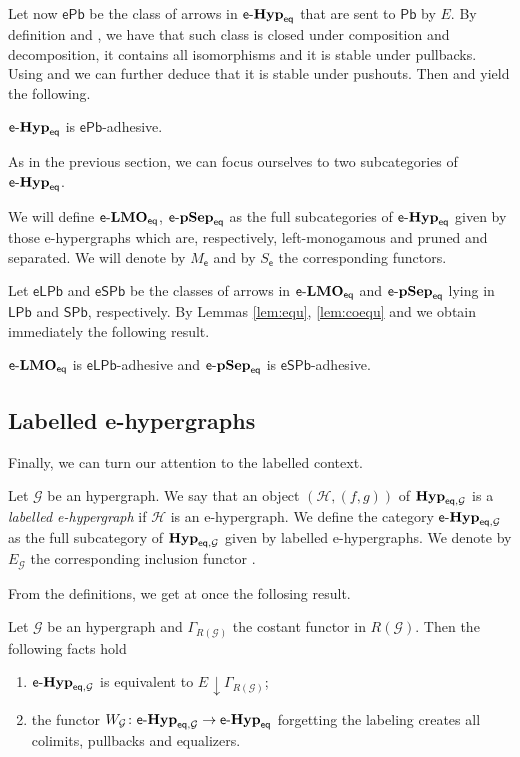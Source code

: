 \documentclass[3p]{elsarticle}
\newcommand{\pbc}{\mathsf{Pb}}
\newcommand{\pbe}{\mathsf{ePb}}
\newcommand{\pbl}{\mathsf{LPb}}
\newcommand{\pbs}{\mathsf{SPb}}
\newcommand{\epbl}{\mathsf{eLPb}}
\newcommand{\epbs}{\mathsf{eSPb}}
\newcommand{\eq}{\mathsf{eq}}
\newcommand{\catname}[1]{\textbf{\textup{#1}}}
\newcommand{\EqHyps}{\catname{Hyp}_{\mathsf{eq}, \mathcal{G}}}
\newcommand{\egg}{\mathsf{e}\text{-}\catname{Hyp}_\eq}
\newcommand{\eggl}{\mathsf{e}\text{-}\catname{Hyp}_{\eq, \mathcal{G}}}
\newcommand{\elm}{\mathsf{e}\text{-}\catname{LMO}_\eq}
\newcommand{\eps}{\mathsf{e}\text{-}\catname{pSep}_\eq}
\renewcommand{\comma}[2]{#1\hspace{1pt} {\downarrow}#2}
\theoremstyle{remark}
\theoremstyle{definition}
\begin{document}
Let now $\pbe$ be the class of arrows in $\egg$ that are sent to $\pbc$ by $E$. By definition and , we have that such class is closed under composition and decomposition, it contains all isomorphisms and it is stable under pullbacks. Using  and  we can further deduce that it is stable under pushouts. Then  and  yield the following.

\begin{cor}\label{cor:pbe}
	$\egg$ is $\pbe$-adhesive.
\end{cor}

As in the previous section, we can focus ourselves to two subcategories of $\egg$.

\begin{defi}We will define $\elm$, $\eps$ as the full subcategories of $\egg$ given by those e-hypergraphs which are, respectively, left-monogamous and pruned and separated. We will denote by $M_{\mathsf{e}}$ and by $S_{\mathsf{e}}$ the corresponding functors.
\end{defi}

Let $\epbl$ and $\epbs$ be the classes of arrows in  $\elm$ and $\eps$ lying in $\pbl$ and $\pbs$, respectively. By Lemmas \ref{lem:equ}, \ref{lem:coequ} and  we obtain immediately the following result.

\begin{cor}
	$\elm$ is $\epbl$-adhesive and $\eps$ is $\epbs$-adhesive.
\end{cor}


\subsection{Labelled e-hypergraphs}\label{sec:sepegg}

Finally, we can turn our attention to the labelled context.

\begin{defi} Let $\mathcal{G}$ be an hypergraph. We say that an object $(\mathcal{H}, (f,g))$ of $\EqHyps$ is a \emph{labelled e-hypergraph} if $\mathcal{H}$ is an e-hypergraph. We define the category $\eggl$ as the full subcategory of $\EqHyps$ given by labelled e-hypergraphs. We denote by $E_\mathcal{G}$ the corresponding inclusion functor .
\end{defi}

From the definitions, we get at once the follosing result.

\begin{prop}\label{prop:varie}
	Let $\mathcal{G}$ be an hypergraph and $\Gamma_{R(\mathcal{G})}$ the costant functor in $R(\mathcal{G})$. Then the following facts hold
	\begin{enumerate}
		\item $\eggl$ is equivalent to $\comma{E}\Gamma_{R(\mathcal{G})}$;
		\item the functor $W_\mathcal{G}\colon \eggl\to \egg$ forgetting the labeling creates all colimits, pullbacks and equalizers. 
	\end{enumerate}
\end{prop}
\end{document}
